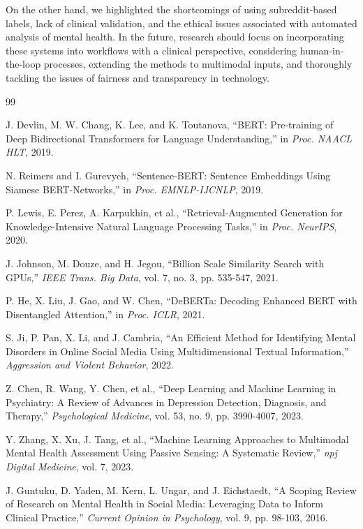\documentclass[11pt]{article}
\begin{document}
On the other hand, we highlighted the shortcomings of using subreddit-based labels, lack of clinical validation, and the ethical issues associated with automated analysis of mental health. In the future, research should focus on incorporating these systems into workflows with a clinical perspective, considering human-in-the-loop processes, extending the methods to multimodal inputs, and thoroughly tackling the issues of fairness and transparency in technology.

\begin{thebibliography}{99}

J. Devlin, M. W. Chang, K. Lee, and K. Toutanova, ``BERT: Pre-training of Deep Bidirectional Transformers for Language Understanding,'' in \textit{Proc. NAACL HLT}, 2019.

N. Reimers and I. Gurevych, ``Sentence-BERT: Sentence Embeddings Using Siamese BERT-Networks,'' in \textit{Proc. EMNLP-IJCNLP}, 2019.

P. Lewis, E. Perez, A. Karpukhin, et al., ``Retrieval-Augmented Generation for Knowledge-Intensive Natural Language Processing Tasks,'' in \textit{Proc. NeurIPS}, 2020.

J. Johnson, M. Douze, and H. Jegou, ``Billion Scale Similarity Search with GPUs,'' \textit{IEEE Trans. Big Data}, vol. 7, no. 3, pp. 535-547, 2021.

P. He, X. Liu, J. Gao, and W. Chen, ``DeBERTa: Decoding Enhanced BERT with Disentangled Attention,'' in \textit{Proc. ICLR}, 2021.

S. Ji, P. Pan, X. Li, and J. Cambria, ``An Efficient Method for Identifying Mental Disorders in Online Social Media Using Multidimensional Textual Information,'' \textit{Aggression and Violent Behavior}, 2022.

Z. Chen, R. Wang, Y. Chen, et al., ``Deep Learning and Machine Learning in Psychiatry: A Review of Advances in Depression Detection, Diagnosis, and Therapy,'' \textit{Psychological Medicine}, vol. 53, no. 9, pp. 3990-4007, 2023.

Y. Zhang, X. Xu, J. Tang, et al., ``Machine Learning Approaches to Multimodal Mental Health Assessment Using Passive Sensing: A Systematic Review,'' \textit{npj Digital Medicine}, vol. 7, 2023.

J. Guntuku, D. Yaden, M. Kern, L. Ungar, and J. Eichstaedt, ``A Scoping Review of Research on Mental Health in Social Media: Leveraging Data to Inform Clinical Practice,'' \textit{Current Opinion in Psychology}, vol. 9, pp. 98-103, 2016.


\end{thebibliography}
\end{document}

